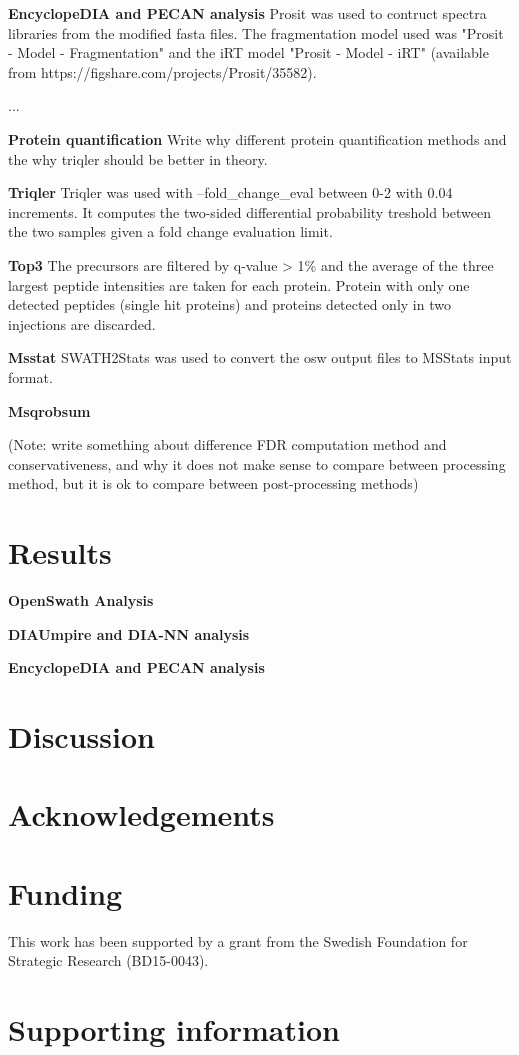 \documentclass[10pt,letterpaper]{article}
\begin{document}
\textbf{EncyclopeDIA and PECAN analysis}
Prosit was used to contruct spectra libraries from the modified fasta files. The fragmentation model used was "Prosit - Model - Fragmentation" and the iRT model "Prosit - Model - iRT" (available from https://figshare.com/projects/Prosit/35582).

...


\textbf{Protein quantification}
Write why different protein quantification methods and the why triqler should be better in theory.


\textbf{Triqler}
Triqler was used with --fold\_change\_eval between 0-2 with 0.04 increments. It computes the two-sided differential probability treshold between the two samples given a fold change evaluation limit. 

\textbf{Top3}
The precursors are filtered by q-value > 1\% and the average of the three largest peptide intensities are taken for each protein. Protein with only one detected peptides (single hit proteins) and proteins detected only in two injections are discarded.


\textbf{Msstat}
SWATH2Stats was used to convert the osw output files to MSStats input format.

\textbf{Msqrobsum}

(Note: write something about difference FDR computation method and conservativeness, and why it does not make sense to compare between processing method, but it is ok to compare between post-processing methods)



\section*{Results}
\textbf{OpenSwath Analysis}

\textbf{DIAUmpire and DIA-NN analysis}

\textbf{EncyclopeDIA and PECAN analysis}


\section*{Discussion}

\section*{Acknowledgements}


\section*{Funding}

This work has been supported by a grant from the Swedish Foundation for Strategic Research (BD15-0043).

\section*{Supporting information}



\end{document}
